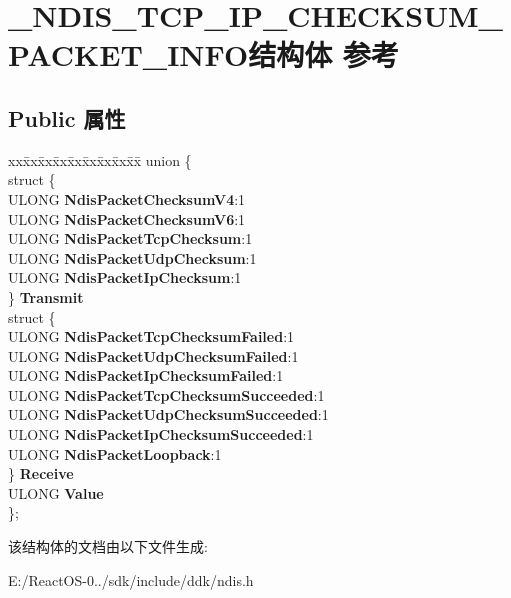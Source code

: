 \hypertarget{struct___n_d_i_s___t_c_p___i_p___c_h_e_c_k_s_u_m___p_a_c_k_e_t___i_n_f_o}{}\section{\+\_\+\+N\+D\+I\+S\+\_\+\+T\+C\+P\+\_\+\+I\+P\+\_\+\+C\+H\+E\+C\+K\+S\+U\+M\+\_\+\+P\+A\+C\+K\+E\+T\+\_\+\+I\+N\+F\+O结构体 参考}
\label{struct___n_d_i_s___t_c_p___i_p___c_h_e_c_k_s_u_m___p_a_c_k_e_t___i_n_f_o}
\subsection*{Public 属性}
\begin{DoxyCompactItemize}
\item 
\mbox{\label{struct___n_d_i_s___t_c_p___i_p___c_h_e_c_k_s_u_m___p_a_c_k_e_t___i_n_f_o_aabad56b20d350eff885d867790410246}} 
\begin{tabbing}
xx\=xx\=xx\=xx\=xx\=xx\=xx\=xx\=xx\=\kill
union \{\\
\>struct \{\\
\>\>ULONG {\bfseries NdisPacketChecksumV4}:1\\
\>\>ULONG {\bfseries NdisPacketChecksumV6}:1\\
\>\>ULONG {\bfseries NdisPacketTcpChecksum}:1\\
\>\>ULONG {\bfseries NdisPacketUdpChecksum}:1\\
\>\>ULONG {\bfseries NdisPacketIpChecksum}:1\\
\>\} {\bfseries Transmit}\\
\>struct \{\\
\>\>ULONG {\bfseries NdisPacketTcpChecksumFailed}:1\\
\>\>ULONG {\bfseries NdisPacketUdpChecksumFailed}:1\\
\>\>ULONG {\bfseries NdisPacketIpChecksumFailed}:1\\
\>\>ULONG {\bfseries NdisPacketTcpChecksumSucceeded}:1\\
\>\>ULONG {\bfseries NdisPacketUdpChecksumSucceeded}:1\\
\>\>ULONG {\bfseries NdisPacketIpChecksumSucceeded}:1\\
\>\>ULONG {\bfseries NdisPacketLoopback}:1\\
\>\} {\bfseries Receive}\\
\>ULONG {\bfseries Value}\\
\}; \\

\end{tabbing}\end{DoxyCompactItemize}


该结构体的文档由以下文件生成\+:\begin{DoxyCompactItemize}
\item 
E\+:/\+React\+O\+S-\/0../sdk/include/ddk/ndis.\+h\end{DoxyCompactItemize}
